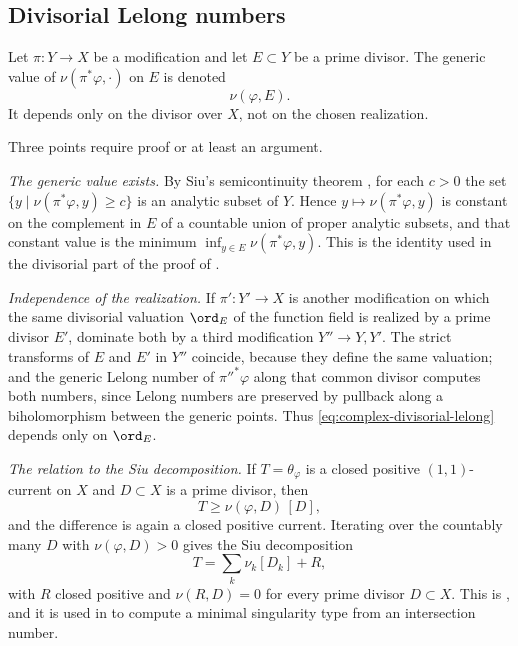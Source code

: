 \subsection{Divisorial Lelong numbers}
\label{sec:ch51-divisorial}

Let $\pi:Y\to X$ be a modification and let $E\subset Y$ be a prime
divisor.  The generic value of
$\nu(\pi^*\varphi,\cdot)$ on $E$ is denoted
\[
                         \nu(\varphi,E).
\tag{51.8}\label{eq:complex-divisorial-lelong}
\]
It depends only on the divisor over $X$, not on the chosen realization.

Three points require proof or at least an argument.

\emph{The generic value exists.}  By Siu's semicontinuity theorem
\cite{Siu74}, for each $c>0$ the set $\{y\mid\nu(\pi^*\varphi,y)\geq
c\}$ is an analytic subset of $Y$.  Hence
$y\mapsto\nu(\pi^*\varphi,y)$ is constant on the complement in $E$ of
a countable union of proper analytic subsets, and that constant value is
the minimum $\inf_{y\in E}\nu(\pi^*\varphi,y)$.  This is the identity
used in the divisorial part of the proof of .

\emph{Independence of the realization.}  If $\pi':Y'\to X$ is another
modification on which the same divisorial valuation $\ord_E$ of the
function field is realized by a prime divisor $E'$, dominate both by a
third modification $Y''\to Y,Y'$.  The strict transforms of $E$ and
$E'$ in $Y''$ coincide, because they define the same valuation; and
the generic Lelong number of $\pi''^*\varphi$ along that common divisor
computes both numbers, since Lelong numbers are preserved by pullback
along a biholomorphism between the generic points.  Thus
\eqref{eq:complex-divisorial-lelong} depends only on $\ord_E$.

\emph{The relation to the Siu decomposition.}  If
$T=\theta_\varphi$ is a closed positive $(1,1)$-current on $X$ and
$D\subset X$ is a prime divisor, then
\[
 T\geq\nu(\varphi,D)\,[D],
\]
and the difference is again a closed positive current.  Iterating over the
countably many $D$ with $\nu(\varphi,D)>0$ gives the Siu
decomposition
\[
 T=\sum_{k}\nu_k[D_k]+R,
\]
with $R$ closed positive and $\nu(R,D)=0$ for every prime divisor
$D\subset X$.  This is \cite{Siu74}, and it is used in
 to compute a minimal singularity type from an
intersection number.

